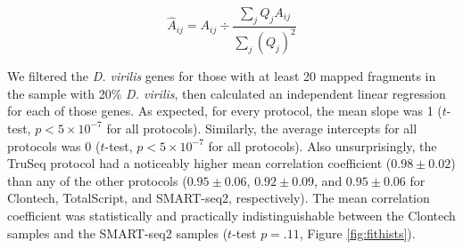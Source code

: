 \begin{equation} \label{eqn:norm}
\hat{A}_{ij} = A_{ij} \div \frac{\sum_j Q_j A_{ij}}{\sum_j (Q_j)^2}  
\end{equation}



We filtered the {\em D. virilis} genes for those with at least 20 mapped fragments in the sample with 20\% {\em D. virilis}, then calculated an independent linear regression for each of those genes.  As expected, for every protocol, the mean slope was 1 ($t$-test, $p<5\times10^{-7}$ for all protocols).  Similarly, the average intercepts for all protocols was 0 ($t$-test, $p<5\times10^{-7}$ for all protocols).  Also unsurprisingly, the TruSeq protocol had a noticeably higher mean correlation coefficient ($0.98 \pm 0.02$) than any of the other protocols ($0.95 \pm 0.06$, $0.92\pm0.09$, and $0.95 \pm 0.06$ for Clontech, TotalScript, and SMART-seq2, respectively). The mean correlation coefficient was statistically and practically indistinguishable between the Clontech samples and the SMART-seq2 samples ($t$-test $p = .11$, Figure \ref{fig:fithists}).


